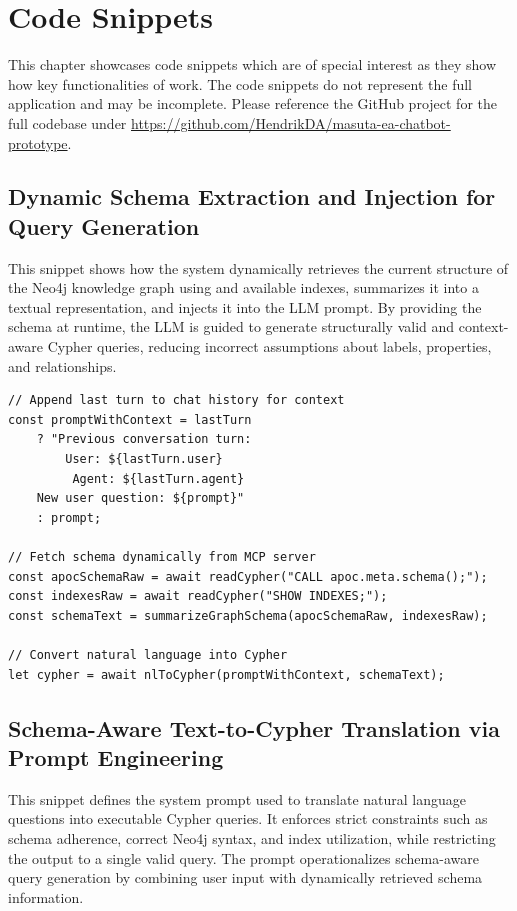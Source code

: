 \chapter{\prototype{} Code Snippets}
\label{appendix:ch:code_snippets}

This chapter showcases code snippets which are of special interest as they show how key functionalities of \prototype{} work. The code snippets do not represent the full application and may be incomplete. Please reference the GitHub project for the full codebase under \url{https://github.com/HendrikDA/masuta-ea-chatbot-prototype}.

\section{Dynamic Schema Extraction and Injection for Query Generation}
\label{appendix:code:schemaaware}
This snippet shows how the system dynamically retrieves the current structure of the Neo4j knowledge graph using  and available indexes, summarizes it into a textual representation, and injects it into the LLM prompt. By providing the schema at runtime, the LLM is guided to generate structurally valid and context-aware Cypher queries, reducing incorrect assumptions about labels, properties, and relationships.

\begin{lstlisting}[style=javascriptstyle, label={lst:system_prompt_1}]
// Append last turn to chat history for context
const promptWithContext = lastTurn
	? "Previous conversation turn:
		User: ${lastTurn.user}
         Agent: ${lastTurn.agent}
	New user question: ${prompt}" 
	: prompt;

// Fetch schema dynamically from MCP server
const apocSchemaRaw = await readCypher("CALL apoc.meta.schema();");
const indexesRaw = await readCypher("SHOW INDEXES;");
const schemaText = summarizeGraphSchema(apocSchemaRaw, indexesRaw);

// Convert natural language into Cypher
let cypher = await nlToCypher(promptWithContext, schemaText);
\end{lstlisting}

\section{Schema-Aware Text-to-Cypher Translation via Prompt Engineering}
\label{appendix:code:systemprompt}
This snippet defines the system prompt used to translate natural language questions into executable Cypher queries. It enforces strict constraints such as schema adherence, correct Neo4j syntax, and index utilization, while restricting the output to a single valid query. The prompt operationalizes schema-aware query generation by combining user input with dynamically retrieved schema information.


